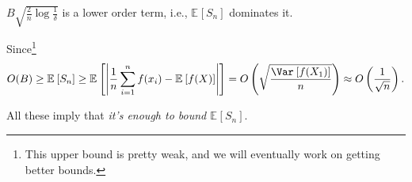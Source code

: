 \begin{note}
	\(B \sqrt{\frac{2}{n} \log \frac{1}{\delta }} \) is a lower order term, i.e., \(\mathbb{E}_{}\left[S_n \right] \) dominates it.
\end{note}
\begin{explanation}
	Since\footnote{This upper bound is pretty weak, and we will eventually work on getting better bounds. }
	\[
		O(B)
		\geq \mathbb{E}_{}\left[S_n \right]
		\geq \mathbb{E}_{}\left[\left\vert \frac{1}{n} \sum_{i=1}^{n} f(x_i) - \mathbb{E}_{}\left[f(X) \right] \right\vert \right]
		= O\left( \sqrt{\frac{\Var_{}\left[f(X_1) \right] }{n}}  \right)
		\approx O\left( \frac{1}{\sqrt{n} } \right) .
	\]
\end{explanation}

All these imply that \emph{it's enough to bound \(\mathbb{E}_{}\left[S_n \right] \)}.